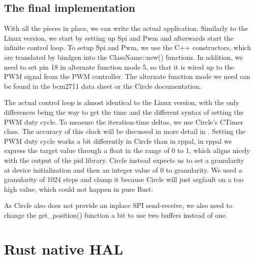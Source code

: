 \subsection{The final implementation}
\label{sec:concept_and_implementation:bare-metal:implementation}

With all the pieces in place, we can write the actual application.
Similarly to the Linux version, we start by setting up Spi and Pwm and afterwards start the infinite control loop.
To setup Spi and Pwm, we use the C++ constructors, which are translated by bindgen into the ClassName::new() functions.
In addition, we need to set pin 18 in alternate function mode 5, so that it is wired up to the PWM signal from the PWM controller.
The alternate function mode we need can be found in the bcm2711 data sheet or the Circle documentation.



The actual control loop is almost identical to the Linux version, with the only differences being the way to get the time and the different syntax of setting the PWM duty cycle.
To measure the iteration-time deltas, we use Circle's CTimer class. The accuracy of this clock will be discussed in more detail in .
Setting the PWM duty cycle works a bit differently in Circle than in rppal,
in rppal we express the target value through a float in the range of 0 to 1,
which aligns nicely with the output of the pid library.
Circle instead expects us to set a granularity at device initialization and then an integer value of 0 to granularity.
We used a granularity of 1024 steps and clamp it because Circle will just segfault on a too high value, which could not happen in pure Rust.



As Circle also does not provide an inplace SPI send-receive, we also need to change the get\_position() function a bit to use two buffers instead of one.


\section{Rust native HAL}
\label{sec:concept_and_implementation:hal}

